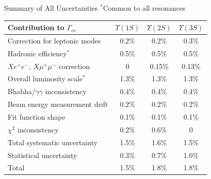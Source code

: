 \documentclass[landscape]{article}
\newcommand{\gee}{{\boldmath $\Gamma_{ee}$}}
\newcommand{\us}{$\Upsilon(1S)$}
\newcommand{\uss}{$\Upsilon(2S)$}
\newcommand{\usss}{$\Upsilon(3S)$}
\begin{document}
\begin{slide:conclusions}

\begin{center}
\begin{minipage}{0.9\linewidth}
Summary of All Uncertainties \hfill {\color{blue} $^*$Common to all resonances}
\end{minipage}
\end{center}

\begin{center}
  \renewcommand{\arraystretch}{1.3}
  \begin{tabular}{l c c c}
    \hline\hline Contribution to \gee & \hspace{0.5 cm}\us\hspace{0.5 cm} & \hspace{0.5 cm}\uss\hspace{0.5 cm} & \hspace{0.5 cm}\usss\hspace{0.5 cm} \\\hline
    Correction for leptonic modes        	   & 0.2\%  & 0.2\%  & 0.3\%  \\
    {\color{blue} Hadronic efficiency$^*$} & {\color{blue} 0.5\%}  & {\color{blue} 0.5\%}  & {\color{blue} 0.5\%}  \\
    $Xe^+e^-$, $X\mu^+\mu^-$ correction  	   & 0      & 0.15\% & 0.13\% \\
    {\color{blue} Overall luminosity scale$^*$} & {\color{blue} 1.3\%}  & {\color{blue} 1.3\%}  & {\color{blue} 1.3\%}  \\
    Bhabha/$\gamma\gamma$ inconsistency  	   & 0.4\%  & 0.4\%  & 0.4\%  \\
    Beam energy measurement drift \hspace{0.5 cm}  & 0.2\%  & 0.2\%  & 0.2\%  \\
    Fit function shape                   	   & 0.1\%  & 0.1\%  & 0.1\%  \\
    $\chi^2$ inconsistency               	   & 0.2\%  & 0.6\%  & 0      \\\hline
    Total systematic uncertainty         	   & {\color{red} 1.5\%}  & {\color{red} 1.6\%}  & {\color{red} 1.5\%}  \\
    Statistical uncertainty              	   & 0.3\%  & 0.7\%  & 1.0\%  \\\hline
    Total                                	   & {\color{red} 1.5\%}  & {\color{red} 1.8\%}  & {\color{red} 1.8\%}  \\\hline\hline
  \end{tabular}
\end{center}

\end{slide:conclusions}
\end{document}

